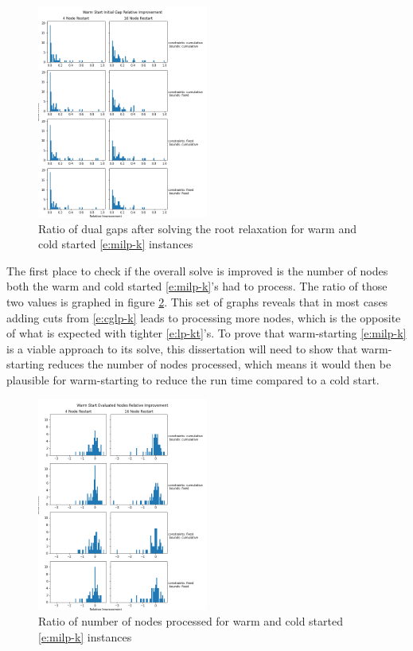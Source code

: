\documentclass[10pt]{article}
\begin{document}
	\begin{figure}[h]
		\centering
		\includegraphics[width=0.5\textwidth]{Warm Start Initial Gap Relative Improvement.png}
		\caption{Ratio of dual gaps after solving the root relaxation for warm and cold started \ref{e:milp-k} instances}
		\label{f:initial_dual_gap}
	\end{figure} 

	The first place to check if the overall solve is improved is the number of nodes both the warm and cold started \ref{e:milp-k}'s had to process. The ratio of those two values is graphed in figure \ref{f:warm_start_nodes}. This set of graphs reveals that in most cases adding cuts from \ref{e:cglp-k} leads to processing more nodes, which is the opposite of what is expected with tighter \ref{e:lp-kt}'s. To prove that warm-starting \ref{e:milp-k} is a viable approach to its solve, this dissertation will need to show that warm-starting reduces the number of nodes processed, which means it would then be plausible for warm-starting to reduce the run time compared to a cold start.
	
	\begin{figure}[h]
		\centering
		\includegraphics[width=0.5\textwidth]{Warm Start Evaluated Nodes Relative Improvement.png}
		\caption{Ratio of number of nodes processed for warm and cold started \ref{e:milp-k} instances}
		\label{f:warm_start_nodes}
	\end{figure}
	
\end{document}
